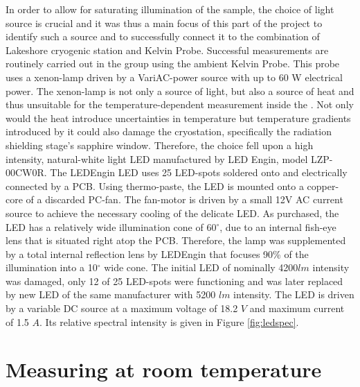 In order to allow for saturating illumination of the sample, the choice of light source is crucial and it was thus a main focus of this part of the project to identify such a source and to successfully connect it to the combination of Lakeshore cryogenic station and \McA{} Kelvin Probe. Successful \spv{} measurements are routinely carried out in the group using the ambient Kelvin Probe. This probe uses a xenon-lamp driven by a VariAC-power source with up to 60 W electrical power. The xenon-lamp is not only a source of light, but also a source of heat and thus unsuitable for the temperature-dependent measurement inside the \McA{}. Not only would the heat introduce uncertainties in temperature but temperature gradients introduced by it could also damage the cryostation, specifically the radiation shielding stage's sapphire window. Therefore, the choice fell upon a high intensity, natural-white light LED manufactured by LED Engin, model LZP-00CW0R. The LEDEngin LED uses 25 LED-spots soldered onto and electrically connected by a PCB. Using thermo-paste, the LED is mounted onto a copper-core of a discarded PC-fan. The fan-motor is driven by a small 12V AC current source to achieve the necessary cooling of the delicate LED. As purchased, the LED has a relatively wide illumination cone of 60$^{\circ}$, due to an internal fish-eye lens that is situated right atop the PCB. Therefore, the lamp was supplemented by a total internal reflection lens by LEDEngin that focuses 90\% of the illumination into a 10$^{\circ}$ wide cone. The initial LED of nominally 4200$lm$ intensity was damaged, only 12 of 25 LED-spots were functioning and was later replaced by new LED of the same manufacturer with 5200 $lm$ intensity. The LED is driven by a variable DC source at a maximum voltage of 18.2 $V$ and maximum current of 1.5 $A$. Its relative spectral intensity is given in Figure \ref{fig:ledspec}.

\section{Measuring \cpd{} at room temperature}
